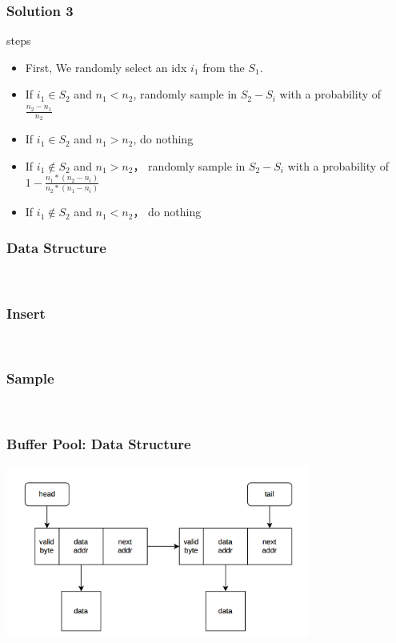 \documentclass[notheorems, aspectratio=54]{beamer}
\begin{document}
\begin{frame}
    \frametitle{Solution 3}
        \begin{block} {steps}
            \begin{itemize}
                \item First, We randomly select an idx $i_1$ from the $S_1$.
                \item If $i_1 \in S_2$ and $n_1 < n_2$, randomly sample in $S_2-S_i$ with a probability of $\frac{n_2-n_1}{n_2}$ 
                \item If $i_1 \in S_2$ and $n_1 > n_2$, do nothing
                \item If $i_1 \notin S_2$ and $n_1 > n_2$， randomly sample in $S_2-S_i$ with a probability of $1-\frac{n_1*(n_2-n_i)}{n_2*(n_1-n_i)}$
                \item If $i_1 \notin S_2$ and $n_1 < n_2$， do nothing
            \end{itemize}
        \end{block}
\end{frame}

\begin{frame}[fragile]
    \frametitle{Data Structure}
    \begin{lstlisting}
        
    \end{lstlisting}
\end{frame}

\begin{frame}[fragile]
    \frametitle{Insert}
    \begin{lstlisting}
        
    \end{lstlisting}
\end{frame}

\begin{frame}[fragile]
    \frametitle{Sample}
    \begin{lstlisting}
        
    \end{lstlisting}
\end{frame}

\begin{frame}
    \frametitle{Buffer Pool: Data Structure}
    \centering
    \includegraphics[width=10cm]{global_img_dir/linklist.png}
\end{frame}
\end{document}
